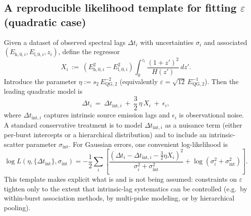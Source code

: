 \subsection{A reproducible likelihood template for fitting \texorpdfstring{$\varepsilon$}{epsilon} (quadratic case)}
Given a dataset of observed spectral lags $\Delta t_i$ with uncertainties $\sigma_i$ and associated $(E_{\mathrm{h},0,i},E_{\mathrm{l},0,i},z_i)$, define the regressor
\begin{equation}
X_i\ :=\ \left(E_{\mathrm{h},0,i}^2-E_{\mathrm{l},0,i}^2\right)\int_0^{z_i}\frac{(1+z')^2}{H(z')}\,dz'.
\end{equation}
Introduce the parameter $\eta:=s_2\,E_{\mathrm{QG},2}^{-2}$ (equivalently $\varepsilon=\sqrt{12}\,E_{\mathrm{QG},2}^{-1}$).
Then the leading quadratic model is
\begin{equation}
\Delta t_i\ =\ \Delta t_{\mathrm{int},i}\ +\ \frac{3}{2}\,\eta\,X_i\ +\ \epsilon_i,
\label{eq:liv_regression_model}
\end{equation}
where $\Delta t_{\mathrm{int},i}$ captures intrinsic source emission lags and $\epsilon_i$ is observational noise.
A standard conservative treatment is to model $\Delta t_{\mathrm{int},i}$ as a nuisance term (either per-burst intercepts or a hierarchical distribution) and to include an intrinsic-scatter parameter $\sigma_{\mathrm{int}}$.
For Gaussian errors, one convenient log-likelihood is
\begin{equation}
\log L(\eta,\{\Delta t_{\mathrm{int}}\},\sigma_{\mathrm{int}})
=-\frac12\sum_i\left[
\frac{\left(\Delta t_i-\Delta t_{\mathrm{int},i}-\frac{3}{2}\eta X_i\right)^2}{\sigma_i^2+\sigma_{\mathrm{int}}^2}
+\log(\sigma_i^2+\sigma_{\mathrm{int}}^2)
\right].
\label{eq:liv_likelihood_template}
\end{equation}
This template makes explicit what is and is not being assumed: constraints on $\varepsilon$ tighten only to the extent that intrinsic-lag systematics can be controlled (e.g.\ by within-burst association methods, by multi-pulse modeling, or by hierarchical pooling).

